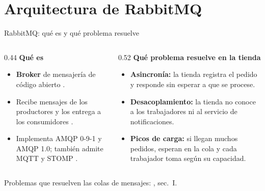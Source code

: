 \section{Arquitectura de RabbitMQ}

\begin{frame}{RabbitMQ: qué es y qué problema resuelve}
  \begin{columns}[T]
    \begin{column}{0.44\textwidth}
      \textbf{Qué es}
      \begin{itemize}
        \item \textbf{Broker} de mensajería de código abierto
              \cite{rabbitmq2026home}.
        \item Recibe mensajes de los productores y los entrega a los
              consumidores \cite{rabbitmq2026amqp}.
        \item Implementa AMQP 0-9-1 y AMQP 1.0; también admite MQTT y
              STOMP \cite{rabbitmq2026connections}.
      \end{itemize}
    \end{column}
    \begin{column}{0.52\textwidth}
      \textbf{Qué problema resuelve en la tienda}
      \begin{itemize}
        \item \textbf{Asincronía:} la tienda registra el pedido y responde
              sin esperar a que se procese.
        \item \textbf{Desacoplamiento:} la tienda no conoce a los
              trabajadores ni al servicio de notificaciones.
        \item \textbf{Picos de carga:} si llegan muchos pedidos, esperan en
              la cola y cada trabajador toma según su capacidad.
      \end{itemize}
    \end{column}
  \end{columns}

  \vspace{0.3cm}
  {\tiny Problemas que resuelven las colas de mensajes: \cite{fu2021fair},
  sec.~I.}
\end{frame}

